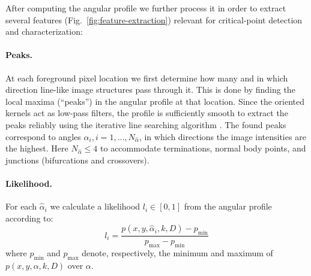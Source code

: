 \documentclass[twocolumn,natbib]{svjour3}
\begin{document}
After computing the angular profile we further process it in order to extract several features (Fig.~\ref{fig:feature-extraction}) relevant for critical-point detection and characterization:

\paragraph{Peaks.} At each foreground pixel location we first determine how many and in which direction line-like image structures pass through it. This is done by finding the local maxima (``peaks'') in the angular profile at that location. Since the oriented kernels act as low-pass filters, the profile is sufficiently smooth to extract the peaks reliably using the iterative line searching algorithm \citep{flannery1992numerical}. The found peaks correspond to angles $\hat{\alpha}_{i}, i=1,\dots,N_{\hat{\alpha}}$, in which directions the image intensities are the highest. Here $N_{\hat{\alpha}}\leq4$ to accommodate terminations, normal body points, and junctions (bifurcations and crossovers).

\paragraph{Likelihood.} For each $\hat{\alpha}_{i}$ we calculate a likelihood $l_i \in \left[ 0, 1 \right]  $ from the angular profile according to:
\begin{equation} 
l_i = \frac{p(x,y,\hat{\alpha}_{i},k,D)-p_{\min}}{p_{\max}-p_{\min}}
\end{equation}
where $p_{\min}$ and $p_{\max}$ denote, respectively, the minimum and maximum of $p(x,y,\alpha,k,D)$ over $\alpha$.
\end{document}
